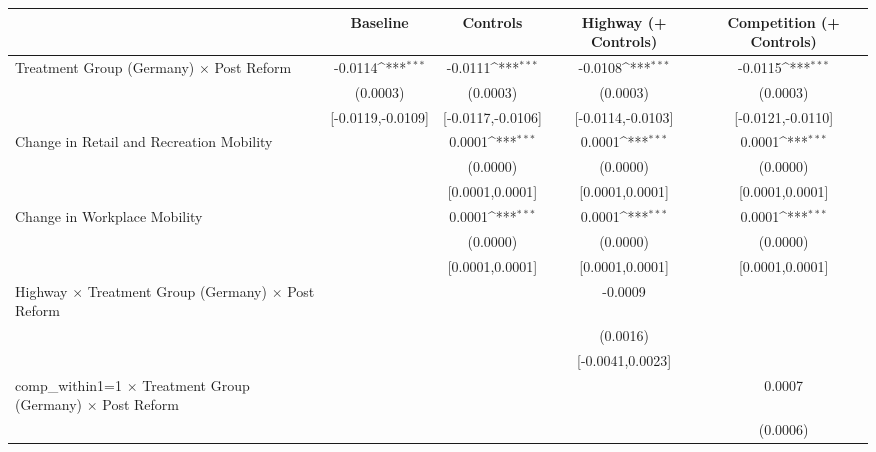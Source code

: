 {
\def\sym#1{\ifmmode^{#1}\else\(^{#1}\)\fi}
\begin{tabular}{l*{4}{c}}
\toprule
                    &\multicolumn{1}{c}{Baseline}&\multicolumn{1}{c}{Controls}&\multicolumn{1}{c}{Highway (+ Controls)}&\multicolumn{1}{c}{Competition (+ Controls)}\\
\midrule
Treatment Group (Germany) $\times$ Post Reform&     -0.0114\sym{***}&     -0.0111\sym{***}&     -0.0108\sym{***}&     -0.0115\sym{***}\\
                    &    (0.0003)         &    (0.0003)         &    (0.0003)         &    (0.0003)         \\
                    &[-0.0119,-0.0109]         &[-0.0117,-0.0106]         &[-0.0114,-0.0103]         &[-0.0121,-0.0110]         \\
Change in Retail and Recreation Mobility&                     &      0.0001\sym{***}&      0.0001\sym{***}&      0.0001\sym{***}\\
                    &                     &    (0.0000)         &    (0.0000)         &    (0.0000)         \\
                    &                     &[0.0001,0.0001]         &[0.0001,0.0001]         &[0.0001,0.0001]         \\
Change in Workplace Mobility&                     &      0.0001\sym{***}&      0.0001\sym{***}&      0.0001\sym{***}\\
                    &                     &    (0.0000)         &    (0.0000)         &    (0.0000)         \\
                    &                     &[0.0001,0.0001]         &[0.0001,0.0001]         &[0.0001,0.0001]         \\
Highway $\times$ Treatment Group (Germany) $\times$ Post Reform&                     &                     &     -0.0009         &                     \\
                    &                     &                     &    (0.0016)         &                     \\
                    &                     &                     &[-0.0041,0.0023]         &                     \\
comp\_within1=1 $\times$ Treatment Group (Germany) $\times$ Post Reform&                     &                     &                     &      0.0007         \\
                    &                     &                     &                     &    (0.0006)         \\

\end{tabular}}
